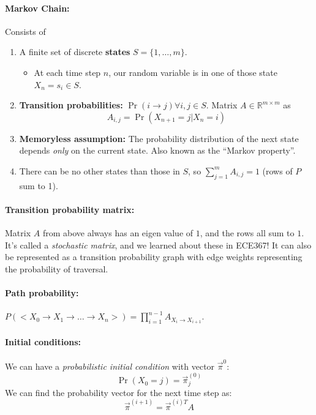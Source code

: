 \documentclass[a4paper,12pt]{report}
\begin{document}
\paragraph{Markov Chain: } Consists of 
\begin{enumerate}
\item A finite set of discrete \textbf{states} $S = \{1, \dots, m\}$.
\begin{itemize}
\item At each time step $n$, our random variable is in one of those state $X_n = s_i \in S$.
\end{itemize}
\item \textbf{Transition probabilities:} $\Pr(i\to j) \forall i,j\in S$. Matrix $A\in \mathbb R^{m\times m}$ as 
\begin{equation}
A_{i,j} = \Pr(X_{n+1} = j | X_n = i)
\end{equation}

\item \textbf{Memoryless assumption:} The probability distribution of the next state depends \textit{only} on the current state. Also known as the ``Markov property''.
\item There can be no other states than those in $S$, so $\sum_{j=1}^{m} A_{i,j} = 1$ (rows of $P$ sum to 1).
\end{enumerate}

\paragraph{Transition probability matrix: } Matrix $A$ from above always has an eigen value of $1$, and the rows all sum to $1$. It's called a \textit{stochastic matrix}, and we learned about these in ECE367! It can also be represented as a transition probability graph with edge weights representing the probability of traversal.

\paragraph{Path probability: } $P(<X_0 \to X_1 \to \dots \to X_n>) = \prod_{i=1}^{n-1} A_{X_i \to X_{i+1}}$.

\paragraph{Initial conditions: } We can have a \textit{probabilistic initial condition} with vector $\vec \pi^0$:
\begin{equation}
\Pr(X_0 = j) = \vec \pi_j^(0)
\end{equation}
We can find the probability vector for the next time step as:
\begin{equation}
\vec \pi^{(i+1)} = \vec\pi^{(i)T}A
\end{equation}
\end{document}

